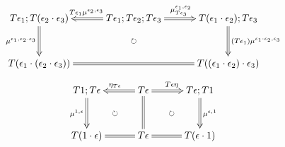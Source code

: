 \documentclass[12pt]{article}
\begin{document}
\pagestyle{empty}

\begin{align*}
  \vcenter{
    \xymatrix@=30pt{
      T \epsilon_1; T (\epsilon_2 \cdot \epsilon_3)
      \ar@{=>}[d]_{\mu^{\epsilon_1, \epsilon_2 \cdot \epsilon_3}}
      &
      T \epsilon_1; T \epsilon_2; T \epsilon_3
      \ar@{=>}[l]_{T \epsilon_1 \mu^{\epsilon_2, \epsilon_3}}
      \ar@{=>}[r]^{\mu^{\epsilon_1, \epsilon_2}_{T \epsilon_3}}
      &
      T (\epsilon_1 \cdot \epsilon_2); T \epsilon_3
      \ar@{=>}[d]^{(T \epsilon_1) \mu^{\epsilon_1 \cdot \epsilon_2, \epsilon_3}}
      \\
      T (\epsilon_1 \cdot (\epsilon_2 \cdot \epsilon_3))
      \ar@{=}[rr]
      & \ar@{}[u]|{\circlearrowright} &
      T ((\epsilon_1 \cdot \epsilon_2) \cdot \epsilon_3)
    }
  }
\end{align*}
\begin{align*}
  \vcenter{
    \xymatrix@=30pt{
      T 1; T \epsilon
      \ar@{=>}[d]_{\mu^{1, \epsilon}}
      &
      T \epsilon \ar@{=}[d]
      \ar@{=>}[l]_{\eta_{T \epsilon}}
      \ar@{=>}[r]^{T \epsilon \eta}
      &
      T \epsilon; T 1
      \ar@{=>}[d]^{\mu^{\epsilon, 1}}
      \\
      T (1 \cdot \epsilon)
      \ar@{}[ru]|{\circlearrowright}
      \ar@{=}[r]
      & T \epsilon &
      T (\epsilon \cdot 1)
      \ar@{}[lu]|{\circlearrowright}
      \ar@{=}[l]
    }
  }
\end{align*}
\end{document}
